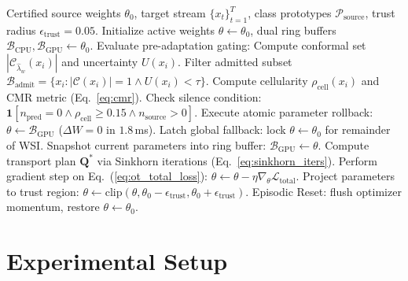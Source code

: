 \documentclass[journal]{IEEEtran}
\begin{document}
\begin{algorithm}[t]
\caption{SafeAdapt Runtime Safeguards with OT-TTA and CMR}
\label{alg:safeadapt}
\scriptsize
\begin{algorithmic}[1]
\REQUIRE Certified source weights $\theta_0$, target stream $\{x_t\}_{t=1}^T$, class prototypes $\mathcal{P}_{\text{source}}$, trust radius $\epsilon_{\text{trust}} = 0.05$.
\STATE Initialize active weights $\theta \leftarrow \theta_0$, dual ring buffers $\mathcal{B}_{\text{CPU}}, \mathcal{B}_{\text{GPU}} \leftarrow \theta_0$.
    \STATE Evaluate pre-adaptation gating:
        \STATE Compute conformal set $|\mathcal{C}_{\hat{\lambda}_w}(x_i)|$ and uncertainty $U(x_i)$.
        \STATE Filter admitted subset $\mathcal{B}_{\text{admit}} = \{x_i : |\mathcal{C}(x_i)| = 1 \land U(x_i) < \tau\}$.
        \STATE Compute cellularity $\rho_{\text{cell}}(x_i)$ and CMR metric (Eq.~\ref{eq:cmr}).
        \STATE Check silence condition: $\mathbf{1}[n_{\text{pred}}=0 \land \rho_{\text{cell}} \ge 0.15 \land n_{\text{source}} > 0]$.
    \ENDIF
        \STATE Execute atomic parameter rollback: $\theta \leftarrow \mathcal{B}_{\text{GPU}}$ ($\Delta W = 0$ in $1.8$\,ms).
            \STATE Latch global fallback: lock $\theta \leftarrow \theta_0$ for remainder of WSI.
        \ENDIF
    \ELSE
        \STATE Snapshot current parameters into ring buffer: $\mathcal{B}_{\text{GPU}} \leftarrow \theta$.
        \STATE Compute transport plan $\mathbf{Q}^*$ via Sinkhorn iterations (Eq.~\ref{eq:sinkhorn_iters}).
        \STATE Perform gradient step on Eq.~(\ref{eq:ot_total_loss}): $\theta \leftarrow \theta - \eta \nabla_\theta \mathcal{L}_{\text{total}}$.
        \STATE Project parameters to trust region: $\theta \leftarrow \text{clip}(\theta, \theta_0 - \epsilon_{\text{trust}}, \theta_0 + \epsilon_{\text{trust}})$.
    \ENDIF
        \STATE Episodic Reset: flush optimizer momentum, restore $\theta \leftarrow \theta_0$.
    \ENDIF
\ENDFOR
\end{algorithmic}
\end{algorithm}

\section{Experimental Setup}
\end{document}
